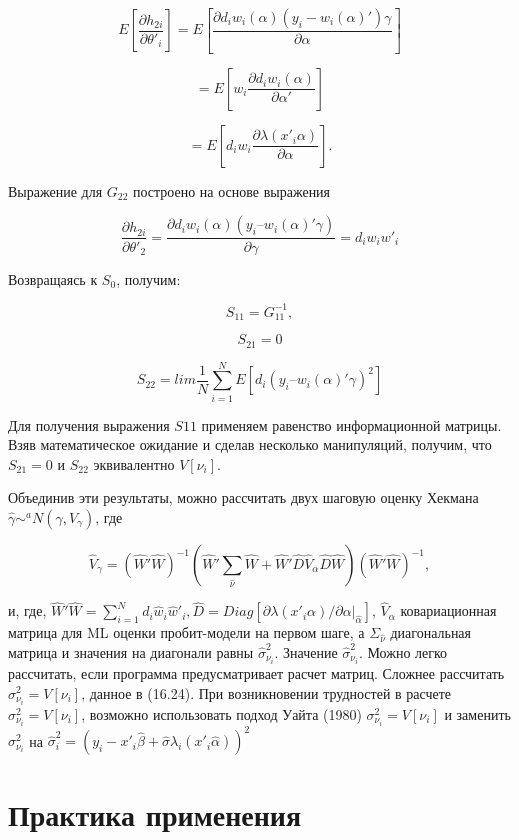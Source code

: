 \[
E\left[\dfrac{{\partial}h_{2i}}{\partial\theta'_{i}}\right]=E \left[\dfrac{\partial d_{i}w_{i}(\alpha)(y_{i}-w_{i}(\alpha)')\gamma}{\partial{\alpha}}\right]
\]

\[
=E\left[w_{i}\dfrac{{\partial}d_{i}w_{i}(\alpha)}{\partial\alpha'}\right]
\]

\[
=E\left[d_{i}w_{i}\dfrac{\partial\lambda(x'_{i}\alpha)}{\partial\alpha}\right].
\]

Выражение для $G_{22}$ построено на основе выражения

\[
\dfrac{\partial h_{2i}}{\partial\theta'_{2}}=\dfrac{{\partial}d_{i}w_{i}(\alpha)(y_i – w_{i}(\alpha)'\gamma)}{\partial\gamma}=d_{i}w_{i}w'_i
\]

Возвращаясь к $S_0$, получим:

\[
S_{11}=G^{-1}_{11},
\]

\[
S_{21}=0
\]

\[
S_{22}=lim\dfrac{1}{N}\sum^{N}_{i=1}E[d_{i}(y_i – w_{i}(\alpha)'\gamma)^2]
\]

Для получения выражения $S{11}$ применяем равенство информационной матрицы. Взяв математическое ожидание и сделав несколько манипуляций, получим, что $S_{21}=0$ и $S_{22}$ эквивалентно $V[\nu_i]$.

Объединив эти результаты, можно рассчитать двух шаговую оценку Хекмана $\hat{\gamma}{\sim}^{a}N(\gamma,V_{\gamma})$, где

\begin{equation}
\hat{V}_{\gamma}=(\hat{W}'\hat{W})^{-1}(\hat{W}'\sum_{\hat{\nu}}\hat{W}+\hat{W}'\hat{D}\hat{V}_{\alpha}\hat{D}\hat{W})(\hat{W}'\hat{W})^{-1},
\end{equation}

и, где, $\hat{W}'\hat{W}=\sum^{N}_{i=1}d_{i}\hat{w}_{i}\hat{w}'_{i},\hat{D}=Diag[\partial\lambda(x'_{i}\alpha)/\partial\alpha|_{\hat{\alpha}}]$, $\hat{V}_{\alpha}$ ковариационная матрица для ML оценки пробит-модели на первом шаге, а $\Sigma_{\hat{\nu}}$ диагональная матрица и значения на диагонали равны $\hat{\sigma}^{2}_{\nu_i}$. Значение $\hat{\sigma}^{2}_{\nu_i}$. Можно легко рассчитать, если программа предусматривает расчет матриц. Сложнее рассчитать $\sigma^{2}_{\nu_i}=V[\nu_i]$, данное в (16.24). При возникновении трудностей в расчете $\sigma^{2}_{\nu_i}=V[\nu_i]$, возможно использовать подход Уайта (1980) $\sigma^{2}_{\nu_i}=V[\nu_i]$ и заменить $\sigma^{2}_{\nu_i}$ на $\hat{\sigma}^{2}_{i}=(y_{i}-x'_{i}\hat{\beta}+\hat{\sigma}\lambda_{i}(x'_{i}\hat{\alpha}))^2$

\section{Практика применения}

